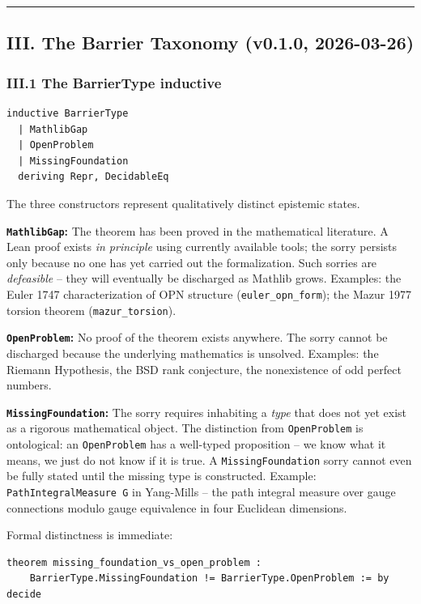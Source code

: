 \documentclass[12pt,a4paper]{article}
\begin{document}
\begin{center}
\rule{0.5\textwidth}{0.4pt}
\end{center}

\subsection{III. The Barrier Taxonomy (v0.1.0, 2026-03-26)}

\subsubsection{III.1 The BarrierType inductive}

\begin{lstlisting}[language=lean]
inductive BarrierType
  | MathlibGap
  | OpenProblem
  | MissingFoundation
  deriving Repr, DecidableEq
\end{lstlisting}

The three constructors represent qualitatively distinct epistemic states.

\textbf{\texttt{MathlibGap}:} The theorem has been proved in the mathematical literature. A Lean proof exists \emph{in principle} using currently available tools; the sorry persists only because no one has yet carried out the formalization. Such sorries are \emph{defeasible}  --  they will eventually be discharged as Mathlib grows. Examples: the Euler 1747 characterization of OPN structure (\texttt{euler\_opn\_form}); the Mazur 1977 torsion theorem (\texttt{mazur\_torsion}).

\textbf{\texttt{OpenProblem}:} No proof of the theorem exists anywhere. The sorry cannot be discharged because the underlying mathematics is unsolved. Examples: the Riemann Hypothesis, the BSD rank conjecture, the nonexistence of odd perfect numbers.

\textbf{\texttt{MissingFoundation}:} The sorry requires inhabiting a \emph{type} that does not yet exist as a rigorous mathematical object. The distinction from \texttt{OpenProblem} is ontological: an \texttt{OpenProblem} has a well-typed proposition  --  we know what it means, we just do not know if it is true. A \texttt{MissingFoundation} sorry cannot even be fully stated until the missing type is constructed. Example: \texttt{PathIntegralMeasure G} in Yang-Mills  --  the path integral measure over gauge connections modulo gauge equivalence in four Euclidean dimensions.

Formal distinctness is immediate:

\begin{lstlisting}[language=lean]
theorem missing_foundation_vs_open_problem :
    BarrierType.MissingFoundation != BarrierType.OpenProblem := by decide
\end{lstlisting}
\end{document}
